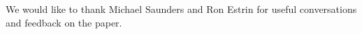 \documentclass{article}
\begin{document}
We would like to thank Michael Saunders and Ron Estrin for useful conversations and feedback on the paper.




\appendix

%
%
%
%
\end{document}
